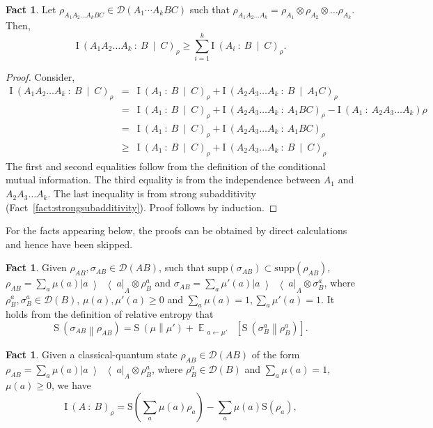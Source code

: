 \documentclass[11pt,a4paper]{article}
\theoremstyle{plain}
\theoremstyle{definition}
\newtheorem{fact}[theorem]{Fact}
\newcommand {\br} [1] {\ensuremath{ \left( #1 \right) }}
\newcommand {\Br} [1] {\ensuremath{ \left[ #1 \right] }}
\newcommand {\minusspace} {\: \! \!}
\newcommand {\smallspace} {\: \!}
\newcommand {\fn} [2] {\ensuremath{ #1 \minusspace \br{ #2 } }}
\newcommand {\Fn} [2] {\ensuremath{ #1 \minusspace \Br{ #2 } }}
\newcommand {\mutinf} [2] {\fn{\mathrm{I}}{#1 \smallspace : \smallspace #2}}
\newcommand {\condmutinf} [3] {\mutinf{#1}{#2 \smallspace \middle\vert \smallspace #3}}
\newcommand {\relent} [2] {\fn{\mathrm{S}}{#1 \middle\| #2}}
\DeclareMathOperator*{\bigE}{\mathbb{E}}
\newcommand {\expec} [2] {\Fn{\bigE_{\substack{#1}}}{#2}}
\newcommand {\ketbratwo} [2] {\ensuremath{ \left| #1 \middle\rangle \middle\langle #2 \right| }}
\newcommand {\ketbra} [1] {\ketbratwo{#1}{#1}}
\begin{document}
\begin{fact}\label{fact:chainrulemutualinf}
Let $\rho_{A_1A_2\ldots A_kBC} \in \mathcal{D}(A_1\cdots A_k BC)$ such that $\rho_{A_1A_2\ldots A_k}=\rho_{A_1}\otimes\rho_{A_2}\otimes\ldots\rho_{A_k}$. Then,
\[\condmutinf{A_1A_2\ldots A_k}{B}{C}_{\rho}\geq\sum_{i=1}^k\condmutinf{A_i}{B}{C}_{\rho}.\]
\end{fact}
\begin{proof}
Consider,
\begin{eqnarray*}
\condmutinf{A_1A_2\ldots A_k}{B}{C}_{\rho}&=&\condmutinf{A_1}{B}{C}_{\rho}+\condmutinf{A_2A_3\ldots A_k}{B}{A_1C}_\rho\\
&=&\condmutinf{A_1}{B}{C}_{\rho}+\mutinf{A_2A_3\ldots A_k}{A_1BC}_{\rho}-\mutinf{A_1}{A_2A_3\ldots A_k}\rho\\
&=&\condmutinf{A_1}{B}{C}_{\rho}+\mutinf{A_2A_3\ldots A_k}{A_1BC}_{\rho}\\
&\geq&\condmutinf{A_1}{B}{C}_{\rho}+\condmutinf{A_2A_3\ldots A_k}{B}{C}_{\rho}
\end{eqnarray*}
The first and second equalities follow from the definition of the conditional mutual information. The third equality is from the independence between $A_1$ and $A_2A_3\ldots A_k$. The last inequality is from strong subadditivity (Fact~\ref{fact:strongsubadditivity}). Proof follows by induction.
\end{proof}

For the facts appearing below, the proofs can be obtained by direct calculations and hence have been skipped. 

\begin{fact}
	\label{fact:relative entropy splitting}
	Given $\rho_{AB},\sigma_{AB}\in\mathcal{D}(AB)$, such that $\text{supp}(\sigma_{AB})\subset \text{supp}(\rho_{AB})$, $\rho_{AB} = \sum_a \mu(a) \ketbra{a}_A \otimes\rho^a_B$ and
	$\sigma_{AB} = \sum_a \mu'(a) \ketbra{a}_A \otimes\sigma^a_B$, where $\rho^a_B,\sigma^a_B\in \mathcal{D}(B)$, $\mu(a),\mu'(a)\geq 0$ and $\sum_a\mu(a)=1,\sum_a\mu'(a)=1$.
	It holds from the definition of relative entropy that
	\[ \relent{\sigma_{AB}}{\rho_{AB}} = \relent{\mu}{\mu'}
	+ \expec{a\leftarrow \mu'} {\relent{\sigma^a_B}{\rho^a_B}}.\]
\end{fact}

\begin{fact}
Given a classical-quantum state $\rho_{AB}\in \mathcal{D}(AB)$ of the form
$\rho_{AB} = \sum_a \mu(a) \ketbra{a}_A \otimes \rho^a_B$,
where $\rho^a_B\in\mathcal{D}(B)$ and $\sum_a \mu(a)=1$, $\mu(a)\geq 0$, we have
\[ \mutinf{A}{B}_{\rho}
= \mathrm{S}\br{\sum_a\mu(a)\rho_a}-\sum_a\mu(a)\mathrm{S}\br{\rho_a},\]
\end{fact}
\end{document}
